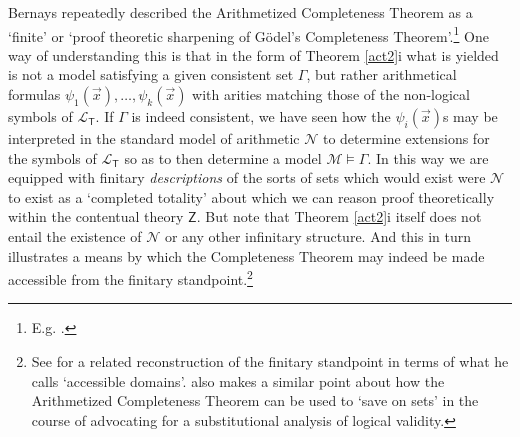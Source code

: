 \documentclass[11pt,fleqn,leqno]{article}
\begin{document}
Bernays repeatedly described the Arithmetized Completeness Theorem as a `finite' or `proof theoretic sharpening of G\"odel's Completeness Theorem'.\footnote{E.g. \citeyearpar[p. VI, 191, 243]{Hilbert1939}.}     One way of understanding this is that in the form of Theorem \ref{act2}i what is yielded is not a model satisfying a given consistent set $\Gamma$, but rather arithmetical formulas $\psi_1(\vec{x}),\ldots,\psi_k(\vec{x})$ with arities matching those of the non-logical symbols of $\mathcal{L}_{\mathsf{T}}$.  If $\Gamma$ is indeed consistent, we have seen how the  $\psi_i(\vec{x})$s may be interpreted in the standard model of arithmetic $\mathcal{N}$ to determine extensions for the symbols of $\mathcal{L}_{\mathsf{T}}$ so as to then determine a model $\mathcal{M} \models \Gamma$.   In this way we are equipped with finitary \textsl{descriptions} of the sorts of sets which would exist were $\mathcal{N}$ to exist as a `completed totality' about which we can reason proof theoretically within the contentual theory $\mathsf{Z}$.   But note that Theorem \ref{act2}i itself does not entail the existence of $\mathcal{N}$ or any other infinitary structure.   And this in turn illustrates a means by which the Completeness Theorem may indeed be made accessible from the finitary standpoint.\footnote{See \citet[\S II.10]{Sieg2013} for a related reconstruction of the finitary standpoint in terms of what he calls `accessible domains'.   \citet[p. 53-56]{Quine1970a} also makes a similar point about how the Arithmetized Completeness Theorem can be used to `save on sets' in the course of advocating for a substitutional analysis of logical validity.} 
\end{document}
